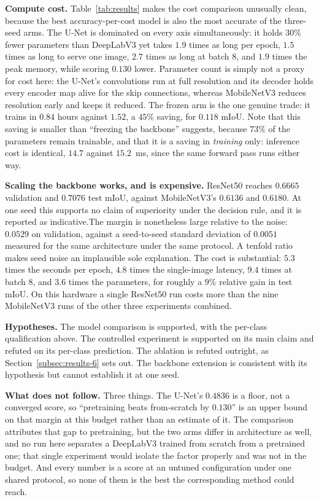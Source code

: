 \textbf{Compute cost.} Table~\ref{tab:results} makes the cost comparison unusually clean, because
the best accuracy-per-cost model is also the most accurate of the three-seed arms. The U-Net is
dominated on every axis simultaneously: it holds $30\%$ fewer parameters than DeepLabV3 yet takes
$1.9$ times as long per epoch, $1.5$ times as long to serve one image, $2.7$ times as long at
batch 8, and $1.9$ times the peak memory, while scoring $0.130$ lower. Parameter count is simply
not a proxy for cost here: the U-Net's convolutions run at full resolution and its decoder holds
every encoder map alive for the skip connections, whereas MobileNetV3 reduces resolution early
and keeps it reduced. The frozen arm is the one genuine trade: it trains in $0.84$ hours against
$1.52$, a $45\%$ saving, for $0.118$ mIoU. Note that this saving is smaller than ``freezing the
backbone'' suggests, because $73\%$ of the parameters remain trainable, and that it is a saving in
\emph{training} only: inference cost is identical, $14.7$ against $15.2$~ms, since the same
forward pass runs either way.

\textbf{Scaling the backbone works, and is expensive.} ResNet50 reaches $0.6665$ validation and
$0.7076$ test mIoU, against MobileNetV3's $0.6136$ and $0.6180$. At one seed this supports no
claim of superiority under the decision rule, and it is reported as indicative.The margin is nonetheless large relative to the noise: $0.0529$ on validation, against a
seed-to-seed standard deviation of $0.0051$ measured for the same architecture under the same
protocol. A tenfold ratio makes seed noise an implausible sole explanation. The cost is substantial: $5.3$ times the seconds per epoch, $4.8$ times the
single-image latency, $9.4$ times at batch 8, and $3.6$ times the parameters, for roughly a
$9\%$ relative gain in test mIoU. On this hardware a single ResNet50 run costs more than the nine
MobileNetV3 runs of the other three experiments combined.

\textbf{Hypotheses.} The model comparison is supported, with the per-class qualification above.
The controlled experiment is supported on its main claim and refuted on its per-class prediction.
The ablation is refuted outright, as Section~\ref{subsec:results-6} sets out. The backbone
extension is consistent with its hypothesis but cannot establish it at one seed.

\textbf{What does not follow.} Three things. The U-Net's $0.4836$ is a floor, not a converged
score, so ``pretraining beats from-scratch by $0.130$'' is an upper bound on that margin at this
budget rather than an estimate of it. The comparison attributes that gap to pretraining, but
the two arms differ in architecture as well, and no run here separates a DeepLabV3 trained from
scratch from a pretrained one; that single experiment would isolate the factor properly and was
not in the budget. And every number is a score at an untuned configuration under one shared
protocol, so none of them is the best the corresponding method could reach.

